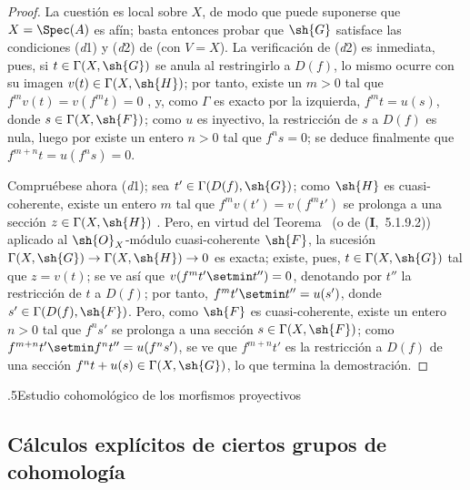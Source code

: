 \documentclass[oneside]{amsart}
\makeatletter
\renewcommand*{\section}{%
  \@startsection{section}{1}{\z@}{.7\linespacing\@plus\linespacing}%
  {.5\linespacing}{\normalfont\bfseries\Large\scshape\centering}}
\newcommand{\ega@arrow}[2]{\mathchoice{#1}{#2}{#2}{#2}}
\renewcommand{\to}{\ega@arrow{\longrightarrow}{\rightarrow}}
\newcommand{\oldpage}[2][]{{\marginnote{\normalfont\textbf{#1}~|~#2}}\ignorespaces}
\let\EGAOriginalLabel\label
\renewcommand{\label}[1]{\phantomsection\EGAOriginalLabel{#1}}
\makeatother
\begin{document}
\oldpage[III]{95}
\begin{proof}
La cuestión es local sobre $X$, de modo que puede suponerse que $X=\Spec(A)$ es afín; basta entonces probar que $\sh{G}$ satisface las condiciones (\textit{d}1) y (\textit{d}2) de  (con $V=X$).
La verificación de (\textit{d}2) es inmediata, pues, si $t\in\Gamma(X,\sh{G})$ se anula al restringirlo a $D(f)$, lo mismo ocurre con su imagen $v(t)\in\Gamma(X,\sh{H})$; por tanto, existe un $m>0$ tal que $f^m v(t)=v(f^m t)=0$ , y, como $\Gamma$ es exacto por la izquierda, $f^m t=u(s)$, donde $s\in\Gamma(X,\sh{F})$; como $u$ es inyectivo, la restricción de $s$ a $D(f)$ es nula, luego por  existe un entero $n>0$ tal que $f^n s=0$; se deduce finalmente que $f^{m+n}t=u(f^n s)=0$.

Compruébese ahora (\textit{d}1); sea $t'\in\Gamma(D(f),\sh{G})$; como $\sh{H}$ es cuasi-coherente, existe un entero $m$ tal que $f^m v(t')=v(f^m t')$ se prolonga a una sección $z\in\Gamma(X,\sh{H})$ .
Pero, en virtud del Teorema~ (o de (\textbf{I},~5.1.9.2)) aplicado al $\sh{O}_X$-módulo cuasi-coherente $\sh{F}$, la sucesión $\Gamma(X,\sh{G})\to\Gamma(X,\sh{H})\to 0$ es exacta; existe, pues, $t\in\Gamma(X,\sh{G})$ tal que $z=v(t)$; se ve así que $v(f^m t'\setmin t'')=0$, denotando por $t''$ la restricción de $t$ a $D(f)$; por tanto, $f^m t'\setmin t''=u(s')$, donde $s'\in\Gamma(D(f),\sh{F})$.
Pero, como $\sh{F}$ es cuasi-coherente, existe un entero $n>0$ tal que $f^n s'$ se prolonga a una sección $s\in\Gamma(X,\sh{F})$; como $f^{m+n}t'\setmin f^n t''=u(f^n s')$, se ve que $f^{m+n}t'$ es la restricción a $D(f)$ de una sección $f^n t+u(s)\in\Gamma(X,\sh{G})$, lo que termina la demostración.
\end{proof}

\section{Estudio cohomológico de los morfismos proyectivos}
\label{section:III.2}


\subsection{Cálculos explícitos de ciertos grupos de cohomología}
\label{subsection:III.2.1}
\end{document}
